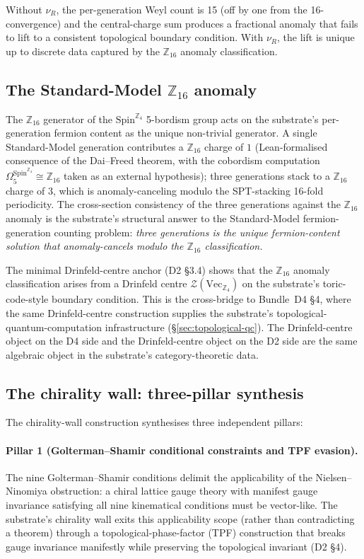 \documentclass[aps,prd,reprint,nofootinbib,superscriptaddress]{revtex4-2}
\begin{document}
Without $\nu_R$, the per-generation Weyl count is 15 (off by one from
the 16-convergence) and the central-charge sum produces a fractional
anomaly that fails to lift to a consistent topological boundary
condition. With $\nu_R$, the lift is unique up to discrete data
captured by the $\mathbb{Z}_{16}$ anomaly classification.

\subsection{The Standard-Model $\mathbb{Z}_{16}$ anomaly}

The $\mathbb{Z}_{16}$ generator of the $\mathrm{Spin}^{\mathbb{Z}_4}$
5-bordism group acts on the substrate's per-generation fermion
content as the unique non-trivial generator. A single Standard-Model
generation contributes a $\mathbb{Z}_{16}$ charge of $1$
(Lean-formalised consequence of the Dai--Freed theorem, with the
cobordism computation $\Omega_5^{\mathrm{Spin}^{\mathbb{Z}_4}} \cong
\mathbb{Z}_{16}$ taken as an external hypothesis); three generations
stack to a
$\mathbb{Z}_{16}$ charge of $3$, which is anomaly-canceling modulo
the SPT-stacking 16-fold periodicity. The cross-section consistency
of the three generations against the $\mathbb{Z}_{16}$ anomaly is the
substrate's structural answer to the Standard-Model fermion-generation
counting problem: \emph{three generations is the unique fermion-content
solution that anomaly-cancels modulo the $\mathbb{Z}_{16}$ classification.}

The minimal Drinfeld-centre anchor (D2 \S 3.4) shows that the
$\mathbb{Z}_{16}$ anomaly classification arises from a Drinfeld
centre $\mathcal{Z}(\mathrm{Vec}_{\mathbb{Z}_4})$ on the substrate's
toric-code-style boundary condition. This is the cross-bridge to
Bundle~D4 \S 4, where the same Drinfeld-centre construction supplies
the substrate's topological-quantum-computation infrastructure
(\S\ref{sec:topological-qc}). The Drinfeld-centre object on the D4
side and the Drinfeld-centre object on the D2 side are the same
algebraic object in the substrate's category-theoretic data.

\subsection{The chirality wall: three-pillar synthesis}

The chirality-wall construction synthesises three independent pillars:

\paragraph{Pillar 1 (Golterman--Shamir conditional constraints and
TPF evasion).} The nine Golterman--Shamir conditions delimit the
applicability of the Nielsen--Ninomiya obstruction: a chiral lattice
gauge theory with manifest gauge invariance satisfying all nine
kinematical conditions must be vector-like. The substrate's chirality
wall exits this applicability scope (rather than contradicting a
theorem) through a topological-phase-factor (TPF) construction
that breaks gauge invariance manifestly while preserving the
topological invariant (D2 \S 4).
\end{document}
